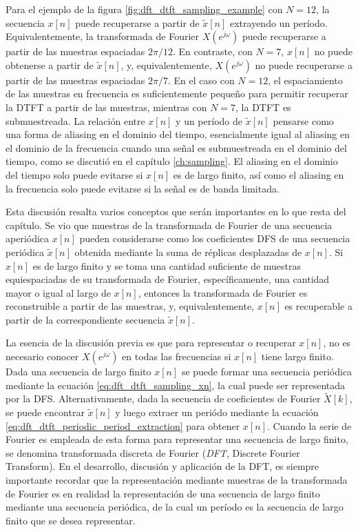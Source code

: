 \documentclass[a4paper]{report}
\begin{document}
Para el ejemplo de la figura \ref{fig:dft_dtft_sampling_example} con \(N=12\), la secuencia \(x[n]\) puede recuperarse a partir de \(\tilde{x}[n]\) extrayendo un período. Equivalentemente, la transformada de Fourier \(X(e^{j\omega})\) puede recuperarse a partir de las muestras espaciadas \(2\pi/12\). En contraste, con \(N=7\), \(x[n]\) no puede obtenerse a partir de \(\tilde{x}[n]\), y, equivalentemente, \(X(e^{j\omega})\) no puede recuperarse a partir de las muestras espaciadas \(2\pi/7\). En el caso con \(N=12\), el espaciamiento de las muestras en frecuencia es suficientemente pequeño para permitir recuperar la DTFT a partir de las muestras, mientras con \(N=7\), la DTFT es submuestreada. La relación entre \(x[n]\) y un período de \(\tilde{x}[n]\) pensarse como una forma de aliasing en el dominio del tiempo, esencialmente igual al aliasing en el dominio de la frecuencia cuando una señal es submuestreada en el dominio del tiempo, como se discutió en el capítulo \ref{ch:sampling}. El aliasing en el dominio del tiempo solo puede evitarse si \(x[n]\) es de largo finito, así como el aliasing en la frecuencia solo puede evitarse si la señal es de banda limitada.

Esta discusión resalta varios conceptos que serán importantes en lo que resta del capítulo. Se vio que muestras de la transformada de Fourier de una secuencia aperiódica \(x[n]\) pueden considerarse como los coeficientes DFS de una secuencia periódica \(\tilde{x}[n]\) obtenida mediante la suma de réplicas desplazadas de \(x[n]\). Si \(x[n]\) es de largo finito y se toma una cantidad suficiente de muestras equiespaciadas de su transformada de Fourier, específicamente, una cantidad mayor o igual al largo de \(x[n]\), entonces la transformada de Fourier es reconstruible a partir de las muestras, y, equivalentemente, \(x[n]\) es recuperable a partir de la correspondiente secuencia \(\tilde{x}[n]\).

La esencia de la discusión previa es que para representar o recuperar \(x[n]\), no es necesario conocer \(X(e^{j\omega})\) en todas las frecuencias si \(x[n]\) tiene largo finito. Dada una secuencia de largo finito \(x[n]\) se puede formar una secuencia periódica mediante la ecuación \ref{eq:dft_dtft_sampling_xn}, la cual puede ser representada por la DFS. Alternativamente, dada la secuencia de coeficientes de Fourier \(\tilde{X}[k]\), se puede encontrar \(\tilde{x}[n]\) y luego extraer un periódo mediante la ecuación \ref{eq:dft_dtft_periodic_period_extraction} para obtener \(x[n]\). Cuando la serie de Fourier es empleada de esta forma para representar una secuencia de largo finito, se denomina transformada discreta de Fourier (\emph{DFT}, Discrete Fourier Transform). En el desarrollo, discusión y aplicación de la DFT, es siempre importante recordar que la representación mediante muestras de la transformada de Fourier es en realidad la representación de una secuencia de largo finito mediante una secuencia periódica, de la cual un período es la secuencia de largo finito que se desea representar.
\end{document}
